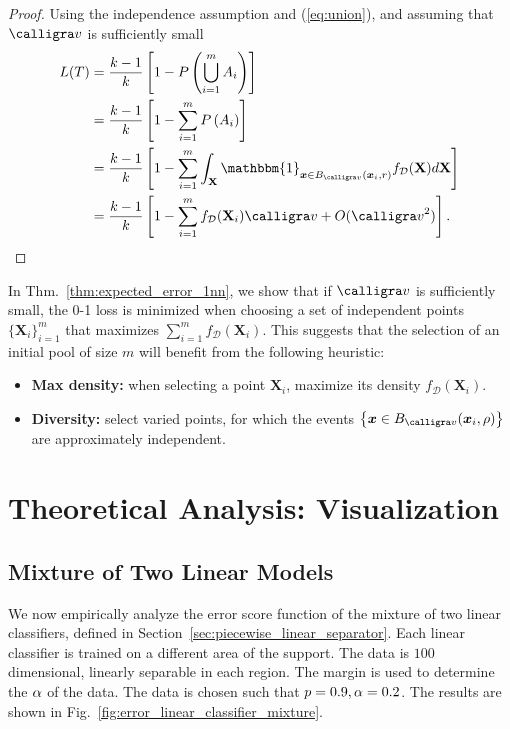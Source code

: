 \documentclass{article}
\newcommand{\bx}{\bm{x}}
\newcommand{\bX}{{\mathbf X}}
\newcommand{\Dd}{\mathcal{D}}
\begin{document}
\begin{proof}
Using the independence assumption and (\ref{eq:union}), and assuming that  ${\calligra v}$ is sufficiently small
\begin{equation*}
\begin{split}
L(T) &= \frac{k-1}{k} \left [ 1- P\left (\bigcup_{i=1}^{m} A_i\right ) \right ] \\
&=\frac{k-1}{k} \left [ 1- \sum_{i=1}^m P\left (A_i\right ) \right ]\\
&=\frac{k-1}{k} \left [1- \sum_{i=1}^m  \int_\bX \mathbbm{1}_{{\textstyle\mathstrut} {\bx\in B_{\calligra v}(\bx_i,r)}} f_\Dd(\bX)d\bX\right ]\\
&= \frac{k-1}{k} \left [1- \sum_{i=1}^m  f_\Dd(\bX_i){\calligra v} + O({\calligra v}^2)\right ].
\end{split}
\end{equation*}
\end{proof}

In Thm.~\ref{thm:expected_error_1nn}, we show that if ${\calligra v}$ is sufficiently small, the 0-1 loss is minimized when choosing a set of independent points $\{\bX_i\}_{i=1}^m$ that maximizes $\sum_{i=1}^m  f_\Dd(\bX_i)$. This suggests that the selection of an initial pool of size $m$ will benefit from the following heuristic: 
\begin{itemize}[noitemsep]
    \item \textbf{Max density:} when selecting a point $\bX_i$, maximize its density $f_\Dd(\bX_i)$.
    \item \textbf{Diversity:} select varied points, for which the events $\left \{\bx\in B_{\calligra v}(\bx_i,\rho)\right \}$ are approximately independent.
\end{itemize}


\section{Theoretical Analysis: Visualization}







\subsection{Mixture of Two Linear Models}


We now empirically analyze the error score function of the mixture of two linear classifiers, defined in Section~\ref{sec:piecewise_linear_separator}. Each linear classifier is trained on a different area of the support. The data is $100$ dimensional, linearly separable in each region. The margin is used to determine the $\alpha$ of the data. The data is chosen such that $p=0.9,\alpha=0.2$. The results are shown in Fig.~\ref{fig:error_linear_classifier_mixture}.
\end{document}
